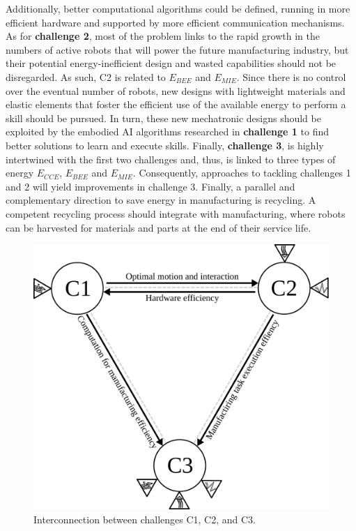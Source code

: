 Additionally, better computational algorithms could be defined, running in more efficient hardware and supported by more efficient communication mechanisms. As for \textbf{challenge 2}, most of the problem links to the rapid growth in the numbers of active robots that will power the future manufacturing industry, but their potential energy-inefficient design and wasted capabilities should not be disregarded. As such, C2 is related to $E_{BEE}$ and $E_{MIE}$. Since there is no control over the eventual number of robots, new designs with lightweight materials and elastic elements that foster the efficient use of the available energy to perform a skill should be pursued. In turn, these new mechatronic designs should be exploited by the embodied AI algorithms researched in \textbf{challenge 1} to find better solutions to learn and execute skills. Finally, \textbf{challenge 3}, is highly intertwined with the first two challenges and, thus, is linked to three types of energy $E_{CCE}$, $E_{BEE}$ and $E_{MIE}$. Consequently, approaches to tackling challenges 1 and 2 will yield improvements in challenge 3. Finally, a parallel and complementary direction to save energy in manufacturing is recycling. A competent recycling process should integrate with manufacturing, where robots can be harvested for materials and parts at the end of their service life.
\begin{figure}[!t]
	\centering
	\includegraphics[width=0.8\columnwidth]{fig/grand_challenges_connections.pdf}
	\caption{Interconnection between challenges C1, C2, and C3.}
	\label{fig:challengesConnected}
\end{figure}
